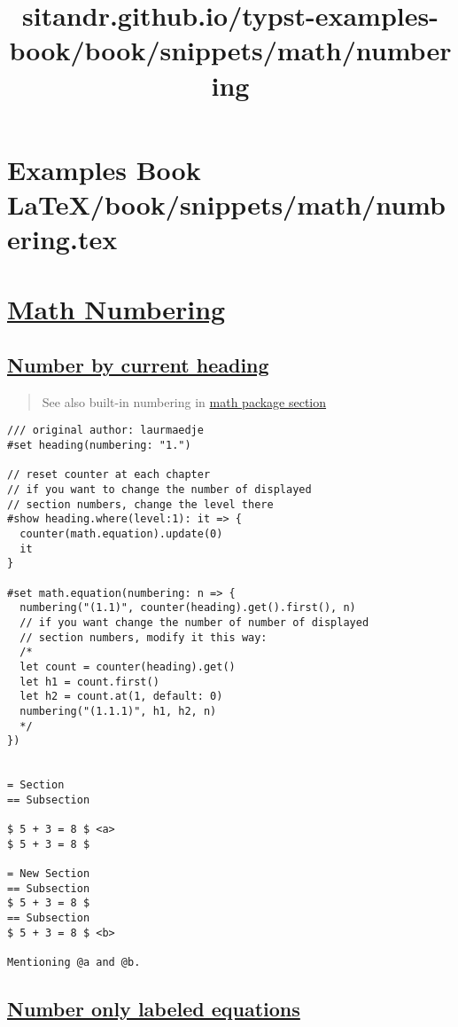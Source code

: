 \section{Examples Book LaTeX/book/snippets/math/numbering.tex}
\title{sitandr.github.io/typst-examples-book/book/snippets/math/numbering}

\section{\texorpdfstring{\hyperref[math-numbering]{Math
Numbering}}{Math Numbering}}\label{math-numbering}

\subsection{\texorpdfstring{\hyperref[number-by-current-heading]{Number
by current
heading}}{Number by current heading}}\label{number-by-current-heading}

\begin{quote}
See also built-in numbering in
\href{../../packages/math.html\#theorems}{math package section}
\end{quote}

\begin{verbatim}
/// original author: laurmaedje
#set heading(numbering: "1.")

// reset counter at each chapter
// if you want to change the number of displayed 
// section numbers, change the level there
#show heading.where(level:1): it => {
  counter(math.equation).update(0)
  it
}

#set math.equation(numbering: n => {
  numbering("(1.1)", counter(heading).get().first(), n)
  // if you want change the number of number of displayed
  // section numbers, modify it this way:
  /*
  let count = counter(heading).get()
  let h1 = count.first()
  let h2 = count.at(1, default: 0)
  numbering("(1.1.1)", h1, h2, n)
  */
})


= Section
== Subsection

$ 5 + 3 = 8 $ <a>
$ 5 + 3 = 8 $

= New Section
== Subsection
$ 5 + 3 = 8 $
== Subsection
$ 5 + 3 = 8 $ <b>

Mentioning @a and @b.
\end{verbatim}

\pandocbounded{}

\subsection{\texorpdfstring{\hyperref[number-only-labeled-equations]{Number
only labeled
equations}}{Number only labeled equations}}\label{number-only-labeled-equations}

